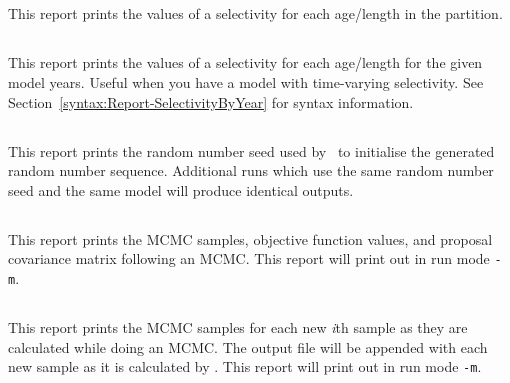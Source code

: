 \subsection{}\label{sec:Report-Selectivity}

This report prints the values of a selectivity for each age/length in the partition.

\subsection{}\label{sec:Report-SelectivityByYear}

This report prints the values of a selectivity for each age/length for the given model years. Useful when you have a model with time-varying selectivity. See Section~\ref{syntax:Report-SelectivityByYear} for syntax information.


\subsection{}\label{sec:Report-RandomNumberSeed}

This report prints the random number seed used by \CNAME\ to initialise the generated random number sequence. Additional runs which use the same random number seed and the same model will produce identical outputs.

\subsection{}\label{sec:Report-MCMC}

This report prints the MCMC samples, objective function values, and proposal covariance matrix following an MCMC. This report will print out in run mode \texttt{-m}.

\subsection{}\label{sec:Report-MCMCSample}

This report prints the MCMC samples for each new \textit{i}th sample as they are calculated while doing an MCMC. The output file will be appended with each new sample as it is calculated by \CNAME. This report will print out in run mode \texttt{-m}.

